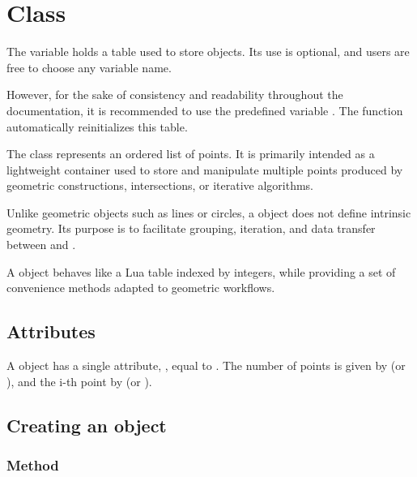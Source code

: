 \section{Class }
\label{sec:class_list_point}

The variable  holds a table used to store  objects.
Its use is optional, and users are free to choose any variable name.

\medskip

However, for the sake of consistency and readability throughout the documentation,
it is recommended to use the predefined variable .
The function  automatically reinitializes this table.

\medskip

The  class represents an ordered list of points.
It is primarily intended as a lightweight container used to store and manipulate multiple points
produced by geometric constructions, intersections, or iterative algorithms.

Unlike geometric objects such as lines or circles, a  object does not define intrinsic geometry.
Its purpose is to facilitate grouping, iteration, and data transfer between  and .

\medskip

A  object behaves like a Lua table indexed by integers,
while providing a set of convenience methods adapted to geometric workflows.

\medskip

\subsection{Attributes}
\label{subsec:list_point_attributes}

A  object has a single attribute, , equal to . The number of points is given by  (or ), and the i-th point by  (or ).

\subsection{Creating an object}
\label{subsec:list_point_create}

\subsubsection{Method }
\label{ssub:meth_list_point_new}

